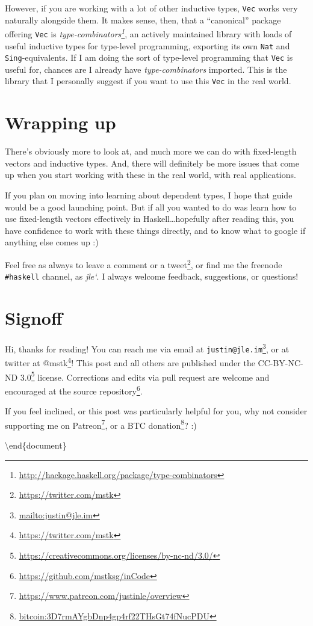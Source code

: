 \documentclass[]{article}
\renewcommand{\href}[2]{#2\footnote{\url{#1}}}
\begin{document}
However, if you are working with a lot of other inductive types, \texttt{Vec}
works very naturally alongside them. It makes sense, then, that a ``canonical''
package offering \texttt{Vec} is
\emph{\href{http://hackage.haskell.org/package/type-combinators}{type-combinators}},
an actively maintained library with loads of useful inductive types for
type-level programming, exporting its own \texttt{Nat} and
\texttt{Sing}-equivalents. If I am doing the sort of type-level programming that
\texttt{Vec} is useful for, chances are I already have \emph{type-combinators}
imported. This is the library that I personally suggest if you want to use this
\texttt{Vec} in the real world.

\section{Wrapping up}\label{wrapping-up}

There's obviously more to look at, and much more we can do with fixed-length
vectors and inductive types. And, there will definitely be more issues that come
up when you start working with these in the real world, with real applications.

If you plan on moving into learning about dependent types, I hope that guide
would be a good launching point. But if all you wanted to do was learn how to
use fixed-length vectors effectively in Haskell\ldots hopefully after reading
this, you have confidence to work with these things directly, and to know what
to google if anything else comes up :)

Feel free as always to leave a comment or a
\href{https://twitter.com/mstk}{tweet}, or find me the freenode
\texttt{\#haskell} channel, as \emph{jle`}. I always welcome feedback,
suggestions, or questions!

\section{Signoff}\label{signoff}

Hi, thanks for reading! You can reach me via email at
\href{mailto:justin@jle.im}{\nolinkurl{justin@jle.im}}, or at twitter at
\href{https://twitter.com/mstk}{@mstk}! This post and all others are published
under the \href{https://creativecommons.org/licenses/by-nc-nd/3.0/}{CC-BY-NC-ND
3.0} license. Corrections and edits via pull request are welcome and encouraged
at \href{https://github.com/mstksg/inCode}{the source repository}.

If you feel inclined, or this post was particularly helpful for you, why not
consider \href{https://www.patreon.com/justinle/overview}{supporting me on
Patreon}, or a \href{bitcoin:3D7rmAYgbDnp4gp4rf22THsGt74fNucPDU}{BTC donation}?
:)

\textbackslash end\{document\}
\end{document}
